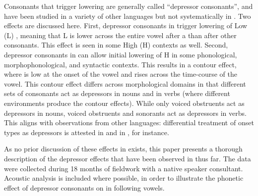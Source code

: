 \documentclass[output=paper
,newtxmath
,modfonts
,nonflat]{langsci/langscibook}
\begin{document}
Consonants that trigger  lowering are generally called “depressor consonants”, and have been studied in a variety of other languages but not systematically in . Two effects are discussed here. First, depressor consonants in  trigger   lowering of Low (L) , meaning that L is lower across the entire vowel after a  than after other consonants. This  effect is seen in some High (H)  contexts as well. Second, depressor consonants in  can allow initial  lowering of H  in some phonological, morphophonological, and syntactic contexts. This results in a contour effect, where  is low at the onset of the vowel and rises across the time-course of the vowel. This contour effect differs across morphological domains in that different sets of consonants act as depressors in nouns and in verbs (where different environments produce the contour effects). While only voiced obstruents act as depressors in nouns, voiced obstruents and sonorants act as depressors in verbs. This aligns with observations from other languages: differential treatment of onset types as depressors is attested in  \citep{Bradshaw1999} and in  \citep{Odden2007}, for instance. 

As no prior discussion of these effects in  exists, this paper presents a thorough description of the depressor effects that have been observed in  thus far. The data were collected during 18 months of fieldwork with a native speaker consultant. Acoustic analysis is included where possible, in order to illustrate the phonetic effect of depressor consonants on  in following vowels. 
\end{document}

